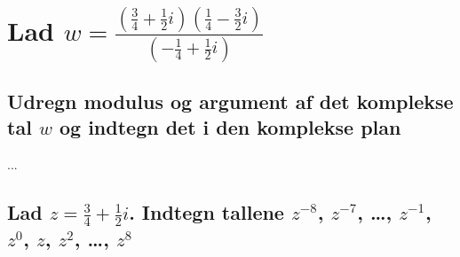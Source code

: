 \documentclass[11pt,a4paper]{article}
\begin{document}
\section{\mdseries
    Lad $w = \frac
        {
        \left(
            \frac{3}{4} + \frac{1}{2}i
        \right)
        \left(
             \frac{1}{4} - \frac{3}{2}i
        \right)
        }
        {
        \left(
            -\frac{1}{4} + \frac{1}{2}i
        \right)
        }$
}

\subsection{\mdseries Udregn modulus og argument af det komplekse tal $w$ og
    indtegn det i den komplekse plan}
...

\subsection{\mdseries Lad $z = \frac{3}{4} + \frac{1}{2}i$. Indtegn tallene
$z^{-8}$, $z^{-7}$, \dots, $z^{-1}$, $z^0$, $z$, $z^2$, \dots, $z^8$}
\end{document}
